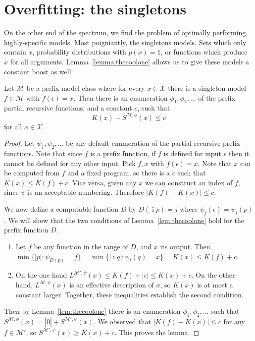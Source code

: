 \documentclass{style/llncs}
\newcommand{\M}{\mathscr M}
\newcommand{\X}{\mathscr X}
\begin{document}
\section{Overfitting: the singletons}

On the other end of the spectrum, we find the problem of optimally performing, highly-specific models. Most poigniantly, the singletons models. Sets which only contain $x$, probability distributions with $p(x) = 1$, or functions which produce $x$ for all arguments. Lemma~\ref{lemma:thecoolone} allows us to give these models a constant boost as well:

\begin{lemma}[overfitting]
Let $\M$ be a prefix model class where for every $x\in\X$ there is a singleton model $f\in\M$ with $f(\epsilon)=x$. Then there is an enumeration $\phi_1,\phi_2,\ldots$ of the prefix partial recursive functions, and a constant $c$, such that
\[
K(x)-S^{\M,\phi}(x)\le c
\]
for all $x\in\X$.
\end{lemma}
\begin{proof}
Let $\psi_1,\psi_2,\ldots$ be any default enumeration of the partial recursive prefix functions. Note that since $f$ is a prefix function, if $f$ is defined for input $\epsilon$ then it cannot be defined for any other input. Pick $f,x$ with $f(\epsilon)=x$. Note that $x$ can be computed from $f$ and a fixed program, so there is a $c$ such that $K(x)\le K(f)+c$. Vice versa, given any $x$ we can construct an index of $f$, since $\psi$ is an acceptable numbering. Therefore $|K(f)-K(x)|\le c$.

We now define a computable function $D$ by $D(\bar\imath p)=j$ where $\psi_j(\epsilon) = \psi_i(p)$.  We will show that the two conditions of Lemma~\ref{lem:thecoolone} hold for the prefix function $D$.

\begin{enumerate}
\item Let $f$ be any function in the range of $D$, and $x$ its output. Then $\min\{|p|:\psi_{D(p)}=f\}=\min\{|\bar\imath q|:\psi_i(q)=x\}=K(x)\le K(f)+c$.
\item On the one hand $L^{\M',\psi}(x)\le K(f)+|\epsilon|\le K(x)+c$. On the other hand, $L^{\M,\psi}(x)$ is an effective description of $x$, so $K(x)$ is at most a constant larger.
Together, these inequalities establish the second condition.
\end{enumerate}

Then by Lemma~\ref{lem:thecoolone} there is an enumeration $\phi_1,\phi_2,\ldots$ such that $S^{\M,\phi}(x)=|\bar 0|+S^{\M',\psi}(x)$. We observed that $|K(f)-K(x)|\le c$ for any $f\in\M'$, so $S^{\M',\psi}(x)\ge K(x)+c$. This proves the lemma.
\end{proof}
\end{document}

